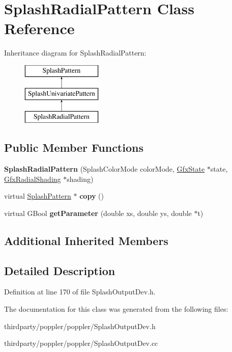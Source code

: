 \hypertarget{class_splash_radial_pattern}{}\section{Splash\+Radial\+Pattern Class Reference}
\label{class_splash_radial_pattern}
Inheritance diagram for Splash\+Radial\+Pattern\+:\begin{figure}[H]
\begin{center}
\leavevmode
\includegraphics[height=3.000000cm]{class_splash_radial_pattern}
\end{center}
\end{figure}
\subsection*{Public Member Functions}
\begin{DoxyCompactItemize}
\item 
\mbox{\label{class_splash_radial_pattern_a1a9a9b8d6b321d90a479ca9afd16a8d5}} 
{\bfseries Splash\+Radial\+Pattern} (Splash\+Color\+Mode color\+Mode, \hyperlink{class_gfx_state}{Gfx\+State} $\ast$state, \hyperlink{class_gfx_radial_shading}{Gfx\+Radial\+Shading} $\ast$shading)
\item 
\mbox{\label{class_splash_radial_pattern_a0bfdfc169ba27b35c944bebc38ed1013}} 
virtual \hyperlink{class_splash_pattern}{Splash\+Pattern} $\ast$ {\bfseries copy} ()
\item 
\mbox{\label{class_splash_radial_pattern_a95e68744025a71ea732c1f9e4b531eb0}} 
virtual G\+Bool {\bfseries get\+Parameter} (double xs, double ys, double $\ast$t)
\end{DoxyCompactItemize}
\subsection*{Additional Inherited Members}


\subsection{Detailed Description}


Definition at line 170 of file Splash\+Output\+Dev.\+h.



The documentation for this class was generated from the following files\+:\begin{DoxyCompactItemize}
\item 
thirdparty/poppler/poppler/Splash\+Output\+Dev.\+h\item 
thirdparty/poppler/poppler/Splash\+Output\+Dev.\+cc\end{DoxyCompactItemize}
